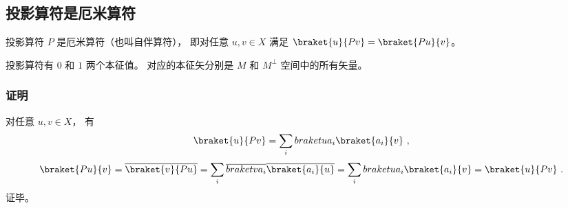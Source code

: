 \subsection{投影算符是厄米算符}
投影算符 $P$ 是厄米算符（也叫自伴算符）， 即对任意 $u, v\in X$ 满足 $\braket{u}{Pv} = \braket{Pu}{v}$。

投影算符有 $0$ 和 $1$ 两个本征值。 对应的本征矢分别是 $M$ 和 $M^\bot$ 空间中的所有矢量。

\subsubsection{证明}
对任意 $u, v\in X$， 有
\begin{equation}
\braket{u}{Pv} = \sum_i \\braket{u}{a_i}\braket{a_i}{v}~,
\end{equation}
\begin{equation}
\braket{Pu}{v} = \overline {\braket{v}{Pu}} = \sum_i \overline{\\braket{v}{a_i}}\overline{\braket{a_i}{u}} = \sum_i \\braket{u}{a_i}\braket{a_i}{v} = \braket{u}{Pv}~.
\end{equation}
证毕。
